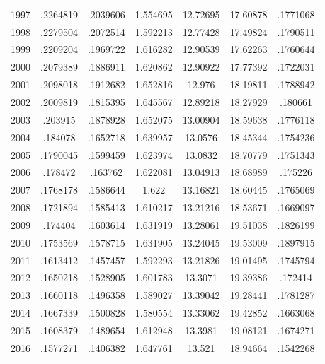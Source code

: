 {\begin{longtable}{l*{1}{cccccc}}
1997        &    .2264819&    .2039606&    1.554695&    12.72695&    17.60878&    .1771068\\
1998        &    .2279504&    .2072514&    1.592213&    12.77428&    17.49824&    .1790511\\
1999        &    .2209204&    .1969722&    1.616282&    12.90539&    17.62263&    .1760644\\
2000        &    .2079389&    .1886911&    1.620862&    12.90922&    17.77392&    .1722031\\
2001        &    .2098018&    .1912682&    1.652816&      12.976&    18.19811&    .1788942\\
2002        &    .2009819&    .1815395&    1.645567&    12.89218&    18.27929&     .180661\\
2003        &     .203915&    .1878928&    1.652075&    13.00904&    18.59638&    .1776118\\
2004        &     .184078&    .1652718&    1.639957&     13.0576&    18.45344&    .1754236\\
2005        &    .1790045&    .1599459&    1.623974&     13.0832&    18.70779&    .1751343\\
2006        &     .178472&     .163762&    1.622081&    13.04913&    18.68989&     .175226\\
2007        &    .1768178&    .1586644&       1.622&    13.16821&    18.60445&    .1765069\\
2008        &    .1721894&    .1585413&    1.610217&    13.21216&    18.53671&    .1669097\\
2009        &     .174404&    .1603614&    1.631919&    13.28061&    19.51038&    .1826199\\
2010        &    .1753569&    .1578715&    1.631905&    13.24045&    19.53009&    .1897915\\
2011        &    .1613412&    .1457457&    1.592293&    13.21826&    19.01495&    .1745794\\
2012        &    .1650218&    .1528905&    1.601783&     13.3071&    19.39386&     .172414\\
2013        &    .1660118&    .1496358&    1.589027&    13.39042&    19.28441&    .1781287\\
2014        &    .1667339&    .1500828&    1.580554&    13.33062&    19.42852&    .1663068\\
2015        &    .1608379&    .1489654&    1.612948&     13.3981&    19.08121&    .1674271\\
2016        &    .1577271&    .1406382&    1.647761&      13.521&    18.94664&    .1542268\\

\end{longtable}}
